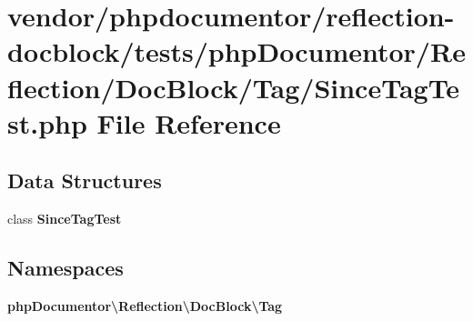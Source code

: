 \section{vendor/phpdocumentor/reflection-\/docblock/tests/php\+Documentor/\+Reflection/\+Doc\+Block/\+Tag/\+Since\+Tag\+Test.php File Reference}
\label{_since_tag_test_8php}
\subsection*{Data Structures}
\begin{DoxyCompactItemize}
\item 
class {\bf Since\+Tag\+Test}
\end{DoxyCompactItemize}
\subsection*{Namespaces}
\begin{DoxyCompactItemize}
\item 
 {\bf php\+Documentor\textbackslash{}\+Reflection\textbackslash{}\+Doc\+Block\textbackslash{}\+Tag}
\end{DoxyCompactItemize}
